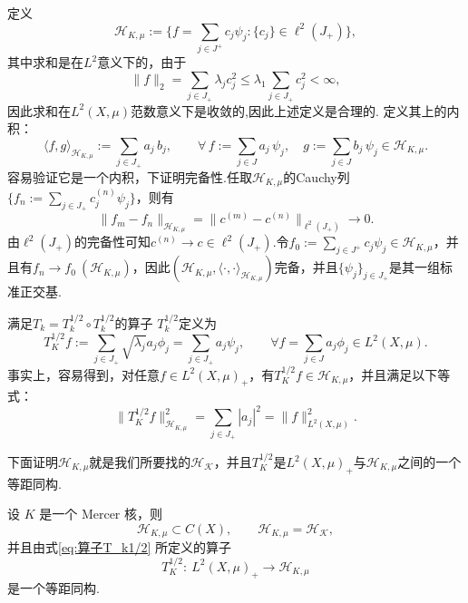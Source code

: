 \documentclass[../master.tex]{subfiles}
\begin{document}
定义
\begin{equation*}
    \mathcal{H}_{K,\mu}:=\{f=\sum_{j\in J^+}c_j\psi_j:\{c_j\}\in\ell^2(J_+)\},
\end{equation*}
其中求和是在$L^2$意义下的，由于
\begin{equation*}
    \|f\|_2 = \sum_{j\in J_+}\lambda_j c_j^2\leq \lambda_1\sum_{j\in J_+}c_j^2<\infty,
\end{equation*}
因此求和在$L^2(X,\mu)$范数意义下是收敛的,因此上述定义是合理的. 定义其上的内积：
\begin{equation}\label{eq: H_Kmu 内积}
    \langle f , g \rangle_{\mathcal{H}_{K,\mu}}
:= \sum_{j\in J_+} a_j\,b_j,
\qquad
\forall\, 
f := \sum_{j\in J}  a_j\, \psi_j,\quad
g := \sum_{j\in J}  b_j\, \psi_j \in \mathcal{H}_{K,\mu}.
\end{equation}
容易验证它是一个内积，下证明完备性.任取$\mathcal{H}_{K,\mu}$的Cauchy列$\{f_n:=\sum_{j\in J_+}c^{(n)}_j\psi_j\}$，则有
\begin{equation*}
    \|f_m - f_n\|_{\mathcal{H}_{K,\mu}} = \|c^{(m)}-c^{(n)}\|_{\ell^2(J_+)}\to 0.
\end{equation*}
由$\ell^2(J_+)$的完备性可知$c^{(n)}\to c\in\ell^2(J_+).$令$f_0:=\sum_{j\in J^+}c_j\psi_j\in\mathcal{H}_{K,\mu}$，并且有$f_n\to f_0~(\mathcal{H}_{K,\mu})$，因此$\left(\mathcal{H}_{K,\mu},\langle\cdot,\cdot\rangle_{\mathcal{H}_{K,\mu}}\right)$完备，并且$\{\psi_j\}_{j\in J_+}$是其一组标准正交基.



满足\(T_k = T_k^{1/2}\circ T_k^{1/2}\)的算子 \(T_k^{1/2}\)定义为
\begin{equation}\label{eq:算子T_k1/2}
    T_K^{1/2}f:=\sum_{j\in J_+}\sqrt{\lambda_j}a_j\phi_j=\sum_{j\in J_+}a_j\psi_j,\qquad \forall f=\sum_{j\in J}a_j\phi_j\in L^2(X,\mu).
\end{equation}
事实上，容易得到，对任意$f\in L^2(X,\mu)_+$，有$T_K^{1/2}f\in \mathcal{H}_{K,\mu}$，并且满足以下等式：
\begin{equation}\label{eq:等距同构}
    \|T_K^{1/2}f\|_{\mathcal{H}_{K,\mu}}^2 = \sum_{j\in J_+}|a_j|^2 = \|f\|^2_{L^2(X,\mu)}.
\end{equation}

下面证明$\mathcal{H}_{K,\mu}$就是我们所要找的$\mathcal{H_K}$，并且$T_K^{1/2}$是$ L^2(X,\mu)_+$与$\mathcal{H}_{K,\mu}$之间的一个等距同构.

\begin{theorem}\label{thm:Mercer-isometry}
设 $K$ 是一个 Mercer 核，则
\[
\mathcal{H}_{K,\mu}\subset C(X), \qquad \mathcal{H}_{K,\mu}=\mathcal {H_K},
\]
并且由式\eqref{eq:算子T_k1/2} 所定义的算子
\[
T_{K}^{1/2}:~L^{2}(X,\mu)_{+}\longrightarrow \mathcal{H}_{K,\mu}
\]
是一个等距同构.
\end{theorem}
\end{document}
